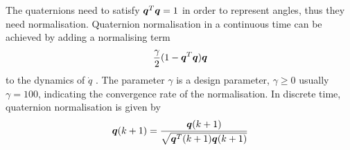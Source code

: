 The quaternions need to satisfy $\boldsymbol{q}^T\boldsymbol{q} = 1$ in order to represent angles, thus they need normalisation.
Quaternion normalisation in a continuous time can be achieved by adding a normalising term
\begin{equation}
\frac{\gamma}{2} ( 1 - \boldsymbol{q}^T\boldsymbol{q})\boldsymbol{q}
\end{equation}
to the dynamics of $\dot{q}$ \citep[p. 31]{fossen2011}. The parameter $\gamma$ is a design parameter, $\gamma \geq 0$ usually $\gamma = 100$, indicating the convergence rate of the normalisation.%
In discrete time, quaternion normalisation is given by 
\begin{equation}
\boldsymbol{q}(k+1) = \frac{\boldsymbol{q}(k+1)}{\sqrt{\boldsymbol{q}^T(k+1)\boldsymbol{q}(k+1)}}
\end{equation}  


